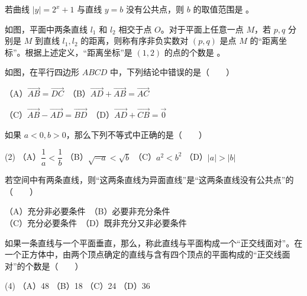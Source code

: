 \begin{question}
若曲线 $|y|=2^x+1$ 与直线 $y=b$ 没有公共点，则 $b$ 的取值范围是 \gkblank{}。

\Needspace{0.4\textheight}
\end{question}
\begin{question}
如图，平面中两条直线 $l_1$ 和 $l_2$ 相交于点 $O$。对于平面上任意一点 $M$，若 $p,q$ 分别是 $M$ 到直线 $l_1,l_2$ 的距离，则称有序非负实数对 $(p,q)$ 是点 $M$ 的“距离坐标”。根据上述定义，“距离坐标”是 $(1,2)$ 的点的个数是 \gkblank{}。
\nopagebreak[4]
\begin{center}\end{center}
\nopagebreak[4]
\end{question}

\Needspace{0.4\textheight}
\begin{question}
如图，在平行四边形 $ABCD$ 中，下列结论中错误的是\mbox{（　　）}

（A）$\overrightarrow{AB}=\overrightarrow{DC}$　（B）$\overrightarrow{AD}+\overrightarrow{AB}=\overrightarrow{AC}$

（C）$\overrightarrow{AB}-\overrightarrow{AD}=\overrightarrow{BD}$　（D）$\overrightarrow{AD}+\overrightarrow{CB}=\vec 0$
\nopagebreak[4]
\begin{center}\end{center}
\nopagebreak[4]
\end{question}
\begin{question}
如果 $a<0,b>0$，那么下列不等式中正确的是\mbox{（　　）}

\begin{gkopts}(2)
\task （A）$\dfrac1a<\dfrac1b$
\task （B）$\sqrt{-a}<\sqrt b$
\task （C）$a^2<b^2$
\task （D）$|a|>|b|$
\end{gkopts}

\end{question}
\begin{question}
若空间中有两条直线，则“这两条直线为异面直线”是“这两条直线没有公共点”的\mbox{（　　）}

（A）充分非必要条件　（B）必要非充分条件\\
（C）充分必要条件　（D）既非充分又非必要条件

\end{question}
\begin{question}
如果一条直线与一个平面垂直，那么，称此直线与平面构成一个“正交线面对”。在一个正方体中，由两个顶点确定的直线与含有四个顶点的平面构成的“正交线面对”的个数是\mbox{（　　）}

\begin{gkopts}(4)
\task （A）48
\task （B）18
\task （C）24
\task （D）36
\end{gkopts}

\end{question}

